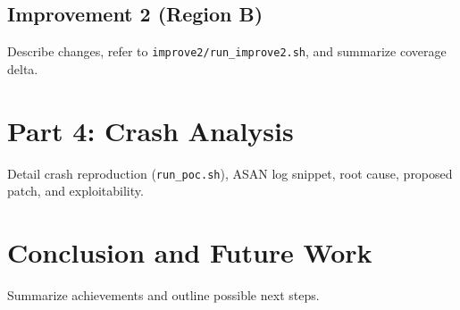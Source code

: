 \documentclass[11pt,a4paper,twocolumn]{article}
\begin{document}
\subsection{Improvement 2 (Region B)}
Describe changes, refer to \texttt{improve2/run\_improve2.sh}, and summarize coverage delta.

\section{Part 4: Crash Analysis}
Detail crash reproduction (\texttt{run\_poc.sh}), ASAN log snippet, root cause, proposed patch, and exploitability.

\section{Conclusion and Future Work}
Summarize achievements and outline possible next steps.

\printbibliography
\end{document}
